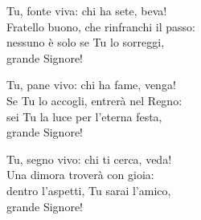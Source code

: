 
\strofa Tu, fonte viva: chi ha sete, beva!\\
Fratello buono, che rinfranchi il passo:\\
nessuno è solo se Tu lo sorreggi,\\
grande Signore!

\spazio

\strofa Tu, pane vivo: chi ha fame, venga!\\
Se Tu lo accogli, entrerà nel Regno:\\
sei Tu la luce per l'eterna festa,\\
grande Signore!

\spazio

\strofa Tu, segno vivo: chi ti cerca, veda!\\
Una dimora troverà con gioia:\\
dentro l'aspetti, Tu sarai l'amico,\\
grande Signore!

